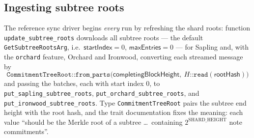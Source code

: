 \documentclass[11pt,a4paper]{article}
\theoremstyle{definition}
\begin{document}
\subsection{Ingesting subtree roots}\label{sec:sync-tree-roots}

The reference sync driver begins \emph{every} run by refreshing the
shard roots: function \texttt{update\_}\allowbreak\texttt{subtree\_roots}
downloads all
subtree roots --- the default \texttt{GetSubtreeRootsArg}, i.e.\
$\mathsf{startIndex} = 0$, $\mathsf{maxEntries} = 0$ --- for Sapling and,
with the \texttt{orchard} feature, Orchard and Ironwood, converting each
streamed message by
\[
\texttt{CommitmentTreeRoot::from\_parts}\bigl(
\mathsf{completingBlockHeight},\ H\texttt{::read}(\mathsf{rootHash})
\bigr)
\]
and passing the batches, each with start index $0$, to
\texttt{put\_sapling\_}\allowbreak\texttt{subtree\_roots},
\texttt{put\_orchard\_}\allowbreak\texttt{subtree\_roots}, and
\texttt{put\_ironwood\_}\allowbreak\texttt{subtree\_roots}.
Type \texttt{CommitmentTreeRoot} pairs the subtree end height with the
root hash, and the trait documentation fixes the meaning:
each value ``should be the Merkle root of a subtree \ldots\ containing
$2^{\mathrm{SHARD\_HEIGHT}}$ note commitments''.
\end{document}
